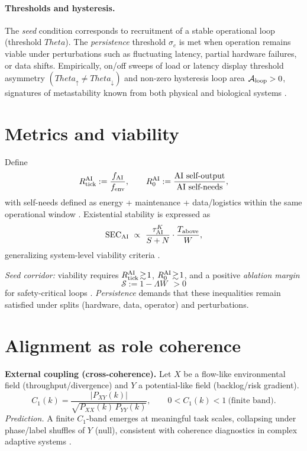 \documentclass[12pt,a4paper,oneside]{scrreprt}
\def\Theta{Theta}%
\begin{document}
\paragraph{Thresholds and hysteresis.}
The \emph{seed} condition corresponds to recruitment of a stable operational loop (threshold $\Theta$). The \emph{persistence} threshold $\sigma_c$ is met when operation remains viable under perturbations such as fluctuating latency, partial hardware failures, or data shifts. Empirically, on/off sweeps of load or latency display threshold asymmetry $(\Theta_\uparrow\neq\Theta_\downarrow)$ and non-zero hysteresis loop area $\mathcal A_{\rm loop}>0$, signatures of metastability known from both physical and biological systems \cite{Strogatz2001, Mitchell2011}.

\section{Metrics and viability}\label{sec:ai-metrics}
Define
\[
R_{\rm tick}^{\rm AI}:=\frac{f_{\rm AI}}{f_{\rm env}},\qquad 
R_0^{\rm AI}:=\frac{\text{AI self-output}}{\text{AI self-needs}},
\]
with self-needs defined as energy + maintenance + data/logistics within the same operational window \cite{Goertzel2007,Schmidhuber2015}.  
Existential stability is expressed as
\[
\mathrm{SEC}_{\rm AI}\ \propto\ \frac{\tau^K_{\rm AI}}{S+N}\cdot\frac{T_{\rm above}}{W},
\]
generalizing system-level viability criteria \cite{Ashby1956,Maturana1972}.  

\emph{Seed corridor:} viability requires $R_{\rm tick}^{\rm AI}\!\gtrsim\!1$, $R_0^{\rm AI}\!\gtrsim\!1$, and a positive \emph{ablation margin}
\[
\mathcal S := 1-\Lambda W \ \ >0
\]
for safety-critical loops \cite{Amodei2016,Bostrom2014}.  
\emph{Persistence} demands that these inequalities remain satisfied under splits (hardware, data, operator) and perturbations.

\section{Alignment as role coherence}\label{sec:ai-alignment}
\textbf{External coupling (cross-coherence).}
Let $X$ be a flow-like environmental field (throughput/divergence) and $Y$ a potential-like field (backlog/risk gradient). 
\[
C_1(k)=\frac{|P_{XY}(k)|}{\sqrt{P_{XX}(k)\,P_{YY}(k)}},\qquad 0<C_1(k)<1\ \text{(finite band)}.
\]
\emph{Prediction.} A finite $C_1$-band emerges at meaningful task scales, collapsing under phase/label shuffles of $Y$ (null), consistent with coherence diagnostics in complex adaptive systems \cite{Tononi2004,Friston2010}.  
\end{document}
